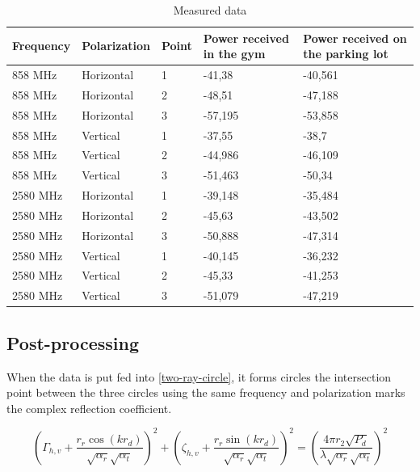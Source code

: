\begin{table}[H]
\centering
\label{my-label}
\begin{tabular}{|l|l|l|p{3.5cm}|p{3.5cm}|}
\hline
\textbf{Frequency} & \textbf{Polarization} & \textbf{Point} & \textbf{Power received in the gym} & \textbf{Power received on the parking lot} \\ \hline
858 MHz            & Horizontal            & 1              & -41,38		& -40,561		\\ \hline
858 MHz            & Horizontal            & 2              & -48,51		& -47,188		\\ \hline
858 MHz            & Horizontal            & 3              & -57,195 		& -53,858		\\ \hline
858 MHz            & Vertical              & 1              & -37,55 		& -38,7			\\ \hline
858 MHz            & Vertical              & 2              & -44,986		& -46,109		\\ \hline
858 MHz            & Vertical              & 3              & -51,463		& -50,34		\\ \hline
2580 MHz           & Horizontal            & 1              & -39,148		& -35,484		\\ \hline
2580 MHz           & Horizontal            & 2              & -45,63		& -43,502		\\ \hline
2580 MHz           & Horizontal            & 3              & -50,888		& -47,314		\\ \hline
2580 MHz           & Vertical              & 1              & -40,145		& -36,232		\\ \hline
2580 MHz           & Vertical              & 2              & -45,33		& -41,253		\\ \hline
2580 MHz           & Vertical              & 3              & -51,079		& -47,219		\\ \hline
\end{tabular}
\caption{Measured data}
\label{tab:data}
\end{table}

\subsection{Post-processing}
When the data is put fed into \autoref{two-ray-circle}, it forms circles the intersection point between the three circles using the same frequency and polarization marks the complex reflection coefficient.

\begin{equation}\label{two-ray-circle}
\left(\Gamma_{h,v}+\frac{r_r\cos(kr_d)}{\sqrt{\alpha_r}\sqrt{\alpha_t}}\right)^2+\left(\zeta_{h,v}+\frac{r_r\sin(kr_d)}{\sqrt{\alpha_r}\sqrt{\alpha_t}}\right)^2=\left(\frac{4\pi r_2 \sqrt{P_d}}{\lambda\sqrt{\alpha_r}\sqrt{\alpha_t}}\right)^2
\end{equation}
\begin{where}
\end{where}
